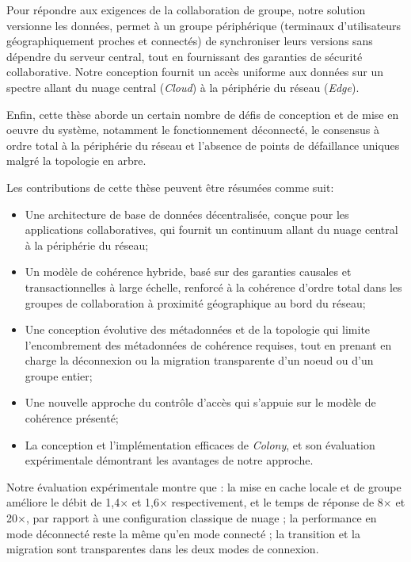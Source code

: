 Pour répondre aux exigences de la collaboration de groupe,
notre solution versionne les données,
permet à un groupe périphérique 
(terminaux d'utilisateurs géographiquement proches et connectés)
de synchroniser leurs versions sans dépendre du serveur central,
tout en fournissant des garanties de sécurité collaborative.
Notre conception fournit un accès uniforme aux données sur un spectre allant
du nuage central (\textit{Cloud}) à la périphérie du réseau (\textit{Edge}).

Enfin, cette thèse aborde un certain nombre de défis de conception et
de mise en oeuvre du système,
notamment le fonctionnement déconnecté,
le consensus à ordre total à la périphérie du réseau
et l'absence de points de défaillance uniques malgré la topologie en arbre.

Les contributions de cette thèse peuvent être résumées comme suit:
\begin{itemize}
    \item Une architecture de base de données décentralisée,
    conçue pour les applications collaboratives,
    qui fournit un continuum allant du nuage central à la périphérie du réseau;
    \item Un modèle de cohérence hybride,
    basé sur des garanties causales et transactionnelles à large échelle,
    renforcé à la cohérence d'ordre total dans les groupes de collaboration 
    à proximité géographique au bord du réseau;
    \item Une conception évolutive des métadonnées et de la topologie qui 
    limite l'encombrement des métadonnées de cohérence requises,
    tout en prenant en charge la déconnexion ou la migration transparente 
    d'un noeud ou d'un groupe entier;
    \item Une nouvelle approche du contrôle d'accès qui s'appuie sur 
    le modèle de cohérence présenté;
    \item La conception et l'implémentation efficaces de \textit{Colony},
    et son évaluation expérimentale démontrant les avantages de notre approche.
\end{itemize}

Notre évaluation expérimentale montre que : 
la mise en cache locale et de groupe améliore le débit de 1,4× et 1,6× 
respectivement, 
et le temps de réponse de 8× et 20×, 
par rapport à une configuration classique de nuage ; 
la performance en mode déconnecté reste la même qu'en mode connecté ; 
la transition et la migration sont transparentes dans les deux modes de 
connexion.
